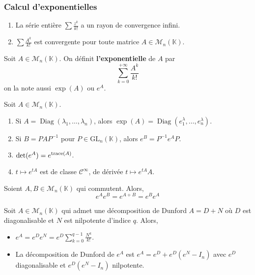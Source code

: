   \subsubsection{Calcul d'exponentielles}


  \begin{lemma}
    \begin{enumerate}[label={\bfseries(\roman*)}]
      \item La série entière $\sum \frac{z^k}{k!}$ a un rayon de convergence infini.
      \item $\sum \frac{A^k}{k!}$ est convergente pour toute matrice $A \in \mathcal{M}_n(\mathbb{K})$.
    \end{enumerate}
  \end{lemma}

  \begin{definition}
    Soit $A \in \mathcal{M}_n(\mathbb{K})$. On définit \textbf{l'exponentielle} de $A$ par
    \[ \sum_{k=0}^{+\infty} \frac{A^k}{k!} \]
    on la note aussi $\exp(A)$ ou $e^A$.
  \end{definition}

  \begin{theorem}
    Soit $A \in \mathcal{M}_n(\mathbb{K})$.
    \begin{enumerate}[label={\bfseries(\roman*)}]
      \item Si $A = \operatorname{Diag}(\lambda_1, \dots, \lambda_n)$, alors $\exp(A) = \operatorname{Diag}(e^\lambda_1, \dots, e^\lambda_n)$.
      \item Si $B = PAP^{-1}$ pour $P \in \mathrm{GL}_n(\mathbb{K})$, alors $e^B = P^{-1} e^A P$.
      \item $\det(e^A) = e^{\operatorname{trace}(A)}$.
      \item $t \mapsto e^{tA}$ est de classe $\mathcal{C}^\infty$, de dérivée $t \mapsto e^{tA}A$.
    \end{enumerate}
  \end{theorem}

  \begin{proposition}
    Soient $A, B \in \mathcal{M}_n(\mathbb{K})$ qui commutent. Alors,
    \[ e^A e^B = e^{A+B} = e^B e^A \]
  \end{proposition}

  \begin{example}
    Soit $A \in \mathcal{M}_n(\mathbb{K})$ qui admet une décomposition de Dunford $A = D+N$ où $D$ est diagonalisable et $N$ est nilpotente d'indice $q$. Alors,
    \begin{itemize}
      \item $e^A = e^D e^N = e^D \sum_{k=0}^{q-1} \frac{N^k}{k!}$.
      \item La décomposition de Dunford de $e^A$ est $e^A = e^D + e^D(e^N - I_n)$ avec $e^D$ diagonalisable et $e^D(e^N - I_n)$ nilpotente.
    \end{itemize}
  \end{example}

